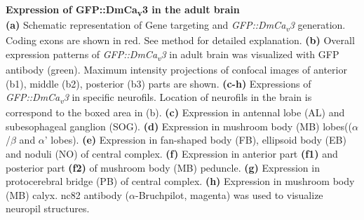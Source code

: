 \label{fig:2} 
\textbf{Expression of GFP::DmCa\textsubscript{v}3 in the adult brain} 
\\ 
\textbf{(a)} Schematic representation of Gene targeting and \emph{GFP::DmCa\textsubscript{v}3} generation. 
Coding exons are shown in red. 
See method for detailed explanation.
\textbf{(b)} Overall expression patterns of \emph{GFP::DmCa\textsubscript{v}3} in adult brain was visualized with GFP antibody (green). 
Maximum intensity projections of confocal images of anterior (b1), middle (b2), posterior (b3) parts are shown.
\textbf{(c-h)} Expressions of \emph{GFP::DmCa\textsubscript{v}3} in specific neurofils. Location of neurofils in the brain is correspond to the boxed area in (b).
\textbf{(c)} Expression in antennal lobe (AL) and subesophageal ganglion (SOG).
\textbf{(d)} Expression in mushroom body (MB) lobes(($\alpha$/$\beta$ and $\alpha$\textquoteright{} lobes). 
\textbf{(e)} Expression in fan-shaped body (FB), ellipsoid body (EB) and noduli (NO) of central complex.
\textbf{(f)} Expression in anterior part \textbf{(f1)} and posterior part \textbf{(f2)} of mushroom body (MB) peduncle.
\textbf{(g)} Expression in protocerebral bridge (PB) of central complex. 
\textbf{(h)} Expression in mushroom body (MB) calyx. 
nc82  antibody ($\alpha$-Bruchpilot, magenta) was used to visualize neuropil structures. 

  
  
  
  
  